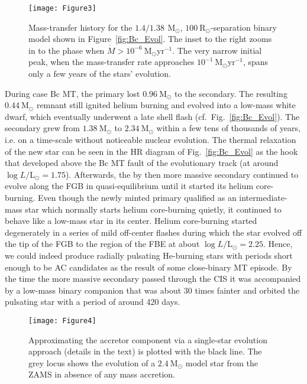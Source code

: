 \documentclass[a4paper,fleqn,usenatbib]{mnras}
\newcommand{\msol}{~\mathrm{M}_\odot}
\newcommand{\rsol}{~\mathrm{R}_\odot}
\newcommand{\llsol}{L/\mathrm{L}_\odot}
\begin{document}
\begin{figure}
	\texttt{[image: Figure3]}
    \caption{Mass-transfer history for the $1.4/1.38\,\msol,\,100 \rsol$-separation binary model 
    		 shown in Figure~\ref{fig:Bc_Evol}. The inset to the right zooms in to the
    		 phase when $\dot{M} > 10^{-6} \msol\mathrm{yr}^{-1}$. 
    		 The very narrow initial peak, when
    		 the mass-transfer rate approaches $10^{-1} \msol \mathrm{yr}^{-1}$, 
    		 spans only a few years of the stars' evolution.
    	    }
    \label{fig:Bc_Evol_MT}
\end{figure}


During case Bc MT, the primary lost $0.96 \msol$ to the secondary. 
The resulting $0.44 \msol$ remnant still ignited helium burning and evolved 
into a low-mass white dwarf, which eventually underwent a  late shell flash 
(cf.~Fig.~\ref{fig:Bc_Evol}).
The secondary grew from $1.38 \msol$ to $2.34 \msol$ within a few tens of thousands of years, 
i.e. on a time-scale without noticeable nuclear evolution. The thermal relaxation of the new star 
can be seen in the HR diagram of Fig.~\ref{fig:Bc_Evol} as the hook that developed above the 
Bc MT fault of the evolutionary track (at around $\log \llsol = 1.75$). Afterwards, the by then 
more massive secondary continued to evolve along the FGB in quasi-equilibrium until it started 
its helium core-burning. Even though the newly minted primary qualified as an 
intermediate-mass star which normally starts helium core-burning quietly, it continued 
to behave like a low-mass star in its center. Helium core-burning started 
degenerately in a series of mild off-center flashes during which the star evolved off the tip 
of the  FGB  to the region of the FBE at about $\log\llsol = 2.25$. 
Hence, we could indeed produce radially pulsating He-burning stars with periods short enough 
to be AC candidates as the result of some close-binary MT episode. 
By the time the more massive secondary passed through the CIS it was accompanied
by a low-mass binary companion that was about 30 times fainter and orbited the pulsating star 
with a period of around 420 days. 


\begin{figure}
	\texttt{[image: Figure4]}
    \caption{Approximating the accretor component via a single-star 
    		 evolution approach (details in the text) is plotted with the black line.
    		 The grey locus shows the evolution of a $2.4 \msol$
    		 model star from the ZAMS in absence of any mass accretion. }
    \label{fig:Bc_Single}
\end{figure}
\end{document}
